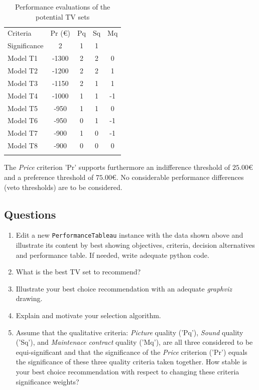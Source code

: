 \begin{table}[h]
\caption{Performance evaluations of the potential TV sets}
\label{tab:15.2}       %
\begin{center}
    \begin{tabular}{l|c|c|c|c}
      \hline\noalign{\smallskip}
      Criteria & Pr (€) & Pq & Sq & Mq \\
      Significance & 2  & 1  & 1  & \\
      \noalign{\smallskip}\hline\noalign{\smallskip}
      Model T1   &     -1300  &  2  &  2  &   0\\
      Model T2   &     -1200  &  2  &  2  &   1\\
      Model T3   &     -1150  &  2  &  1  &   1\\
      Model T4   &     -1000  &  1  &  1  &  -1\\
      Model T5   &     -950   &  1  &  1  &   0\\
      Model T6   &     -950   &  0  &  1  &  -1\\
      Model T7   &     -900   &  1  &  0  &  -1\\
      Model T8   &     -900   &  0  &  0  &   0\\
      \noalign{\smallskip}\hline
    \end{tabular}
\end{center}
\end{table}

The \emph{Price} criterion 'Pr' supports furthermore an indifference threshold of $25.00$€ and a preference threshold of $75.00$€. No considerable performance differences (veto thresholds) are to be considered.

\subsection{Questions}
\label{sec:15.3.2}

\begin{enumerate}
\item Edit a new \texttt{PerformanceTableau} instance with the data shown above and illustrate its content by best showing objectives, criteria, decision alternatives and performance table. If needed, write adequate python code.
\item What is the best TV set to recommend?
\item Illustrate your best choice recommendation with an adequate \emph{graphviz} drawing.
\item Explain and motivate your selection algorithm.
\item Assume that the qualitative criteria: \emph{Picture} quality ('Pq'), \emph{Sound} quality ('Sq'), and \emph{Maintenace contract} quality ('Mq'), are all three considered to be equi-significant and that the significance of the \emph{Price} criterion ('Pr') equals the significance of these three quality criteria taken together. How stable is your best choice recommendation with respect to changing these criteria significance weights?
\end{enumerate}   

